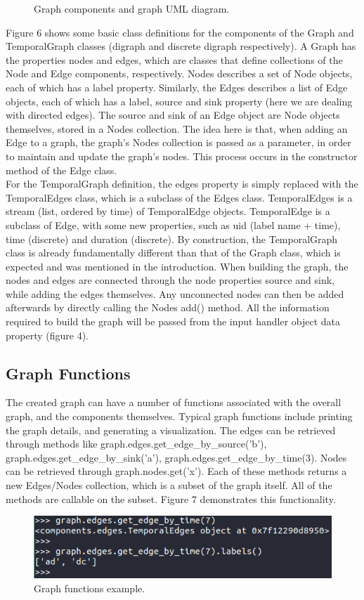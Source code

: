 \begin{design}
\begin{figure}[t]
    \caption{Graph components and graph UML diagram.}
\end{figure}
Figure 6 shows some basic class definitions for the components of the Graph and TemporalGraph classes (digraph and discrete digraph respectively). A Graph has the properties nodes and edges, which are classes that define collections of the Node and Edge components, respectively. Nodes describes a set of Node objects, each of which has a label property. Similarly, the Edges describes a list of Edge objects, each of which has a label, source and sink property (here we are dealing with directed edges). The source and sink of an Edge object are Node objects themselves, stored in a Nodes collection. The idea here is that, when adding an Edge to a graph, the graph's Nodes collection is passed as a parameter, in order to maintain and update the graph's nodes. This process occurs in the constructor method of the Edge class.\\
For the TemporalGraph definition, the edges property is simply replaced with the TemporalEdges class, which is a subclass of the Edges class. TemporalEdges is a stream (list, ordered by time) of TemporalEdge objects. TemporalEdge is a subclass of Edge, with some new properties, such as uid (label name + time), time (discrete) and duration (discrete). By construction, the TemporalGraph class is already fundamentally different than that of the Graph class, which is expected and was mentioned in the introduction. When building the graph, the nodes and edges are connected through the node properties source and sink, while adding the edges themselves. Any unconnected nodes can then be added afterwards by directly calling the Nodes add() method. All the information required to build the graph will be passed from the input handler object data property (figure 4).
\subsection{Graph Functions}
The created graph can have a number of functions associated with the overall graph, and the components themselves. Typical graph functions include printing the graph details, and generating a visualization. The edges can be retrieved through methods like graph.edges.get\_edge\_by\_source('b'), graph.edges.get\_edge\_by\_sink('a'), graph.edges.get\_edge\_by\_time(3). Nodes can be retrieved through graph.nodes.get('x'). Each of these methods returns a new Edges/Nodes collection, which is a subset of the graph itself. All of the methods are callable on the subset. Figure 7 demonstrates this functionality.
\begin{figure}[h]
    \centering
    \includegraphics[scale=0.7]{images/graph_get_edge_labels.PNG}
    \caption{Graph functions example.}
\end{figure}


\end{design}
